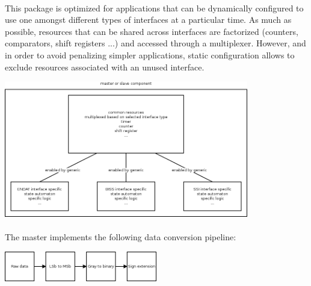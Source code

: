 \documentclass[12pt]{article}
\begin{document}
\paragraph{}
This package is optimized for applications that can be dynamically configured
to use one amongst different types of interfaces at a particular time. As much
as possible, resources that can be shared across interfaces are factorized
(counters, comparators, shift registers ...) and accessed through a multiplexer.
However, and in order to avoid penalizing simpler applications, static
configuration allows to exclude resources associated with an unused interface.
\begin{center}
  \includegraphics[width=0.8\textwidth]{./dia/arch/main.png}
\end{center}

\paragraph{}
The master implements the following data conversion pipeline:
\begin{center}
  \includegraphics[width=0.5\textwidth]{./dia/master_pipeline/main.png}
\end{center}
\end{document}
